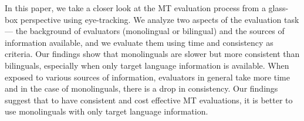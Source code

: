 In this paper, we take a closer look at the MT evaluation process from a glass-box perspective using eye-tracking. We analyze two aspects of the evaluation task --- the background of evaluators (monolingual or bilingual) and the sources of information available, and we evaluate them using time and consistency as criteria. Our findings show that monolinguals are slower but more consistent than bilinguals, especially when only target language information is available. When exposed to various sources of information, evaluators in general take more time and in the case of monolinguals, there is a drop in consistency. Our findings suggest that to have consistent and cost effective MT evaluations, it is better to use monolinguals with only target language information.
